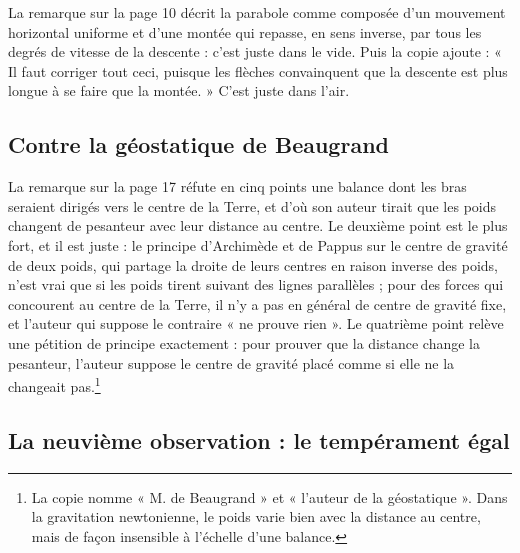 \documentclass[11pt,a4paper]{article}
\begin{document}
La remarque sur la page 10 décrit la parabole comme composée d'un mouvement
horizontal uniforme et d'une montée qui repasse, en sens inverse, par tous les
degrés de vitesse de la descente : c'est juste dans le vide. Puis la copie
ajoute : « Il faut corriger tout ceci, puisque les flèches convainquent que la
descente est plus longue à se faire que la montée. » C'est juste dans l'air.

\subsection*{Contre la géostatique de Beaugrand}

La remarque sur la page 17 réfute en cinq points une balance dont les bras
seraient dirigés vers le centre de la Terre, et d'où son auteur tirait que les
poids changent de pesanteur avec leur distance au centre. Le deuxième point est
le plus fort, et il est juste : le principe d'Archimède et de Pappus sur le
centre de gravité de deux poids, qui partage la droite de leurs centres en
raison inverse des poids, n'est vrai que si les poids tirent suivant des
lignes parallèles ; pour des forces qui concourent au centre de la Terre, il
n'y a pas en général de centre de gravité fixe, et l'auteur qui suppose le
contraire « ne prouve rien ». Le quatrième point relève une pétition de
principe exactement : pour prouver que la distance change la pesanteur,
l'auteur suppose le centre de gravité placé comme si elle ne la changeait
pas.\footnote{La copie nomme « M. de Beaugrand » et « l'auteur de la
géostatique ». Dans la gravitation newtonienne, le poids varie bien avec la
distance au centre, mais de façon insensible à l'échelle d'une balance.}

\subsection*{La neuvième observation : le tempérament égal}
\end{document}
